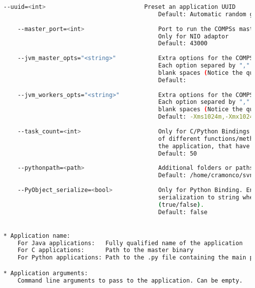 \begin{lstlisting}[language=bash]
    --uuid=<int>                            Preset an application UUID
                                            Default: Automatic random generation
                                            
    --master_port=<int>                     Port to run the COMPSs master communications.
                                            Only for NIO adaptor
                                            Default: 43000
                                            
    --jvm_master_opts="<string>"            Extra options for the COMPSs Master JVM. 
                                            Each option separed by "," and without 
                                            blank spaces (Notice the quotes)
                                            Default: 
                                            
    --jvm_workers_opts="<string>"           Extra options for the COMPSs Workers JVMs.
                                            Each option separed by "," and without 
                                            blank spaces (Notice the quotes)
                                            Default: -Xms1024m,-Xmx1024m,-Xmn400m
                                            
    --task_count=<int>                      Only for C/Python Bindings. Maximum number 
                                            of different functions/methods, invoked from 
                                            the application, that have been selected as tasks
                                            Default: 50
                                            
    --pythonpath=<path>                     Additional folders or paths to add to the PYTHONPATH
                                            Default: /home/cramonco/svn/compss/framework/trunk/compss
                                            
    --PyObject_serialize=<bool>             Only for Python Binding. Enable the object 
                                            serialization to string when possible 
                                            (true/false).
                                            Default: false


* Application name:
    For Java applications:   Fully qualified name of the application
    For C applications:      Path to the master binary
    For Python applications: Path to the .py file containing the main program

* Application arguments:
    Command line arguments to pass to the application. Can be empty.
\end{lstlisting}

